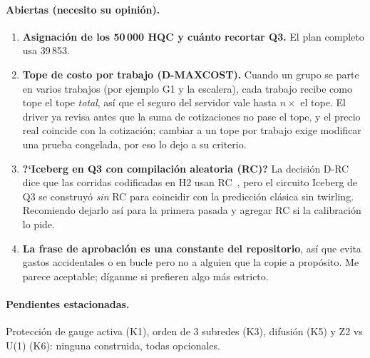 \documentclass[11pt,a4paper]{article}
\begin{document}
\paragraph{Abiertas (necesito su opini\'on).}
\begin{enumerate}[leftmargin=1.6em]
  \item \textbf{Asignaci\'on de los 50\,000 HQC y cu\'anto recortar Q3.} El plan completo usa 39\,853.
  \item \textbf{Tope de costo por trabajo (D-MAXCOST).} Cuando un grupo se parte en varios trabajos (por
    ejemplo G1 y la escalera), cada trabajo recibe como tope el tope \emph{total}, as\'i que el seguro del
    servidor vale hasta $n\times$ el tope. El driver ya revisa antes que la suma de cotizaciones no pase el
    tope, y el precio real coincide con la cotizaci\'on; cambiar a un tope por trabajo exige modificar una prueba
    congelada, por eso lo dejo a su criterio.
  \item \textbf{?`Iceberg en Q3 con compilaci\'on aleatoria (RC)?} La decisi\'on D-RC dice que las corridas
    codificadas en H2 usan RC~\cite{wallman2016}, pero el circuito Iceberg de Q3 se construy\'o \emph{sin} RC para coincidir con
    la predicci\'on cl\'asica sin twirling. Recomiendo dejarlo as\'i para la primera pasada y agregar RC si la
    calibraci\'on lo pide.
  \item \textbf{La frase de aprobaci\'on es una constante del repositorio}, as\'i que evita gastos accidentales o
    en bucle pero no a alguien que la copie a prop\'osito. Me parece aceptable; d\'iganme si prefieren algo m\'as
    estricto.
\end{enumerate}

\paragraph{Pendientes estacionadas.} Protecci\'on de gauge activa (K1), orden de 3 subredes (K3), difusi\'on (K5) y
Z2 vs U(1) (K6): ninguna construida, todas opcionales.

\end{document}
